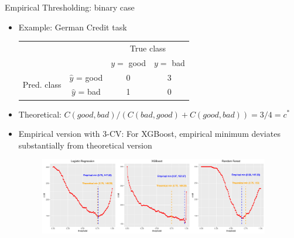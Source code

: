 \documentclass[11pt,compress,t,notes=noshow, xcolor=table]{beamer}
\begin{document}
\begin{vbframe}{Empirical Thresholding: binary case}
    \begin{itemize}
        \item Example: German Credit task
        \footnotesize{
        \begin{center}
                            \begin{tabular}{cc|cc}
        			& &\multicolumn{2}{c}{True class} \\
        			& & $y=$ good & $y=$ bad  \\
        			\hline
        			\multirow{2}{*}{\parbox{0.3cm}{Pred.  class}} & $\hat y$ = good & 0 & 3 \\
        			& $\hat y$ = bad & 1 & 0\\
                \end{tabular}
        \end{center}
        }
        \item Theoretical: $C(good,bad)/(C(bad,good)+C(good,bad))=3/4=c^{*}$ 

        \item Empirical version with 3-CV: For XGBoost, empirical minimum deviates substantially from theoretical version

                \begin{figure}[h]
            \centering
            \includegraphics[width=0.95\textwidth]{figure_man/threshold_plots.pdf}
        \end{figure}

    \end{itemize}
\end{vbframe}
\end{document}
